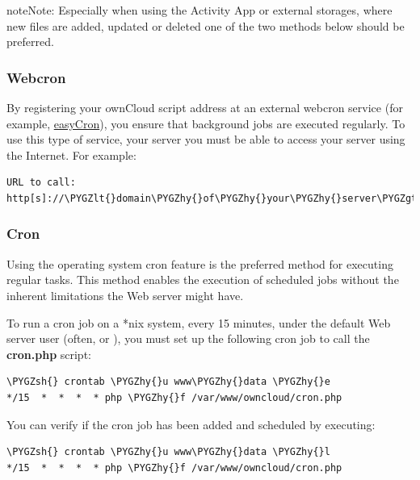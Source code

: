 \documentclass[letterpaper,10pt,english]{sphinxmanual}
\def\PYGZlt{\char`\<}
\def\PYGZgt{\char`\>}
\def\PYGZsh{\char`\#}
\def\PYGZhy{\char`\-}
\begin{document}
\begin{notice}{note}{Note:}
Especially when using the Activity App or external storages, where new
files are added, updated or deleted one of the two methods below should be
preferred.
\end{notice}


\subsubsection{Webcron}
\label{configuration_server/background_jobs_configuration:webcron}
By registering your ownCloud  script address at an external webcron
service (for example, \href{http://www.easycron.com/}{easyCron}), you ensure that background jobs are executed
regularly. To use this type of service, your server you must be able to access
your server using the Internet. For example:

\begin{Verbatim}[commandchars=\\\{\}]
URL to call: http[s]://\PYGZlt{}domain\PYGZhy{}of\PYGZhy{}your\PYGZhy{}server\PYGZgt{}/owncloud/cron.php
\end{Verbatim}


\subsubsection{Cron}
\label{configuration_server/background_jobs_configuration:cron}
Using the operating system cron feature is the preferred method for executing regular tasks.  This method enables the execution of scheduled jobs without the inherent limitations the Web server might have.

To run a cron job on a *nix system, every 15 minutes, under the default Web server user (often,  or ), you must set up the following cron job to call the \textbf{cron.php} script:

\begin{Verbatim}[commandchars=\\\{\}]
\PYGZsh{} crontab \PYGZhy{}u www\PYGZhy{}data \PYGZhy{}e
*/15  *  *  *  * php \PYGZhy{}f /var/www/owncloud/cron.php
\end{Verbatim}

You can verify if the cron job has been added and scheduled by executing:

\begin{Verbatim}[commandchars=\\\{\}]
\PYGZsh{} crontab \PYGZhy{}u www\PYGZhy{}data \PYGZhy{}l
*/15  *  *  *  * php \PYGZhy{}f /var/www/owncloud/cron.php
\end{Verbatim}
\end{document}
